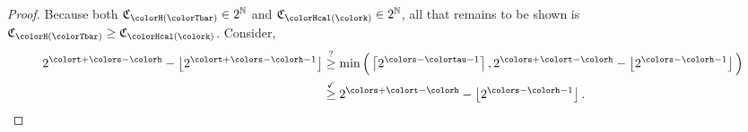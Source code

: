 \begin{proof}
Because both $\mathfrak{C}_{\colorH(\colorTbar)} \in 2^{\mathbb{N}}$ and $\mathfrak{C}_{\colorHcal(\colork)} \in 2^{\mathbb{N}}$, all that remains to be shown is $\mathfrak{C}_{\colorH(\colorTbar)} \geq \mathfrak{C}_{\colorHcal(\colork)}$.
Consider,
\begin{align*}
2^{\colort + \colors - \colorh} - \left\lfloor2^{\colort + \colors - \colorh - 1} \right\rfloor
&\stackrel{?}{\geq}
\min\Big(
\left\lceil 2^{\colors - \colortau - 1} \right\rceil,
2^{\colors + \colort - \colorh} - \left\lfloor 2^{\colors - \colorh - 1} \right\rfloor
\Big)\\
&\stackrel{\checkmark}{\geq}
2^{\colors + \colort - \colorh} - \left\lfloor 2^{\colors - \colorh - 1} \right\rfloor.
\end{align*}
\end{proof}
